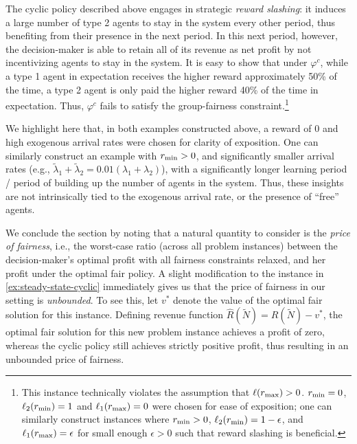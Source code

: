 \documentclass[12pt]{article}
\begin{document}
The cyclic policy described above engages in strategic {\it reward slashing}: it induces a large number of type 2 agents to stay in the system every other period, thus benefiting from their presence in the next period. In this next period, however, the decision-maker is able to retain all of its revenue as net profit by not incentivizing agents to stay in the system. %
It is easy to show that under $\varphi^c$, while a type 1 agent in expectation receives the higher reward approximately 50\% of the time, a type 2 agent is only paid the higher reward 40\% of the time in expectation. Thus, $\varphi^c$ fails to satisfy the group-fairness constraint.\footnote{This instance technically violates the assumption that $\ell(r_{\max}) > 0$. $r_{\min} = 0$, $\ell_2(r_{\min}) = 1$ and $\ell_1(r_{\max}) = 0$ were chosen for ease of exposition; one can similarly construct instances where $r_{\min} > 0$, $\ell_2(r_{\min}) = 1-\epsilon$, and $\ell_1(r_{\max}) = \epsilon$ for small enough $\epsilon > 0$ such that reward slashing is beneficial.}

{We highlight here that, in both examples constructed above, a reward of 0 and high exogenous arrival rates were chosen for clarity of exposition. One can similarly construct an example with $r_{\min} > 0$, and significantly smaller arrival rates (e.g., $\tilde{\lambda}_1 + \tilde{\lambda}_2 = 0.01(\lambda_1 + \lambda_2)$), with a significantly longer learning period / period of building up the number of agents in the system. Thus, these insights are not intrinsically tied to the exogenous arrival rate, or the presence of ``free'' agents.} 

{We conclude the section by noting that a natural quantity to consider is the {\it price of fairness}, i.e., the worst-case ratio (across all problem instances) between the decision-maker's optimal profit with all fairness constraints relaxed, and her profit under the optimal fair policy. A slight modification to the instance in \cref{ex:steady-state-cyclic} immediately gives us that the price of fairness in our setting is {\it unbounded}. To see this, let $v^*$ denote the value of the optimal fair solution for this instance. Defining revenue function $\widehat{R}(\widetilde{N}) = R(\widetilde{N}) - v^*$, the optimal fair solution for this new problem instance achieves a profit of zero, whereas the cyclic policy still achieves strictly positive profit, thus resulting in an unbounded price of fairness.}
\end{document}

